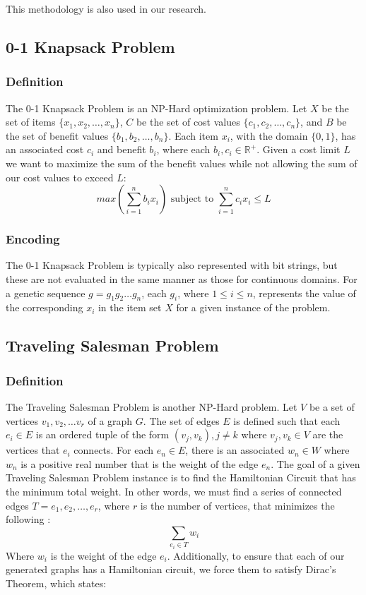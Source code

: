 \noindent This methodology is also used in our research.

%
%
\subsection*{0-1 Knapsack Problem}
\subsubsection*{Definition}

The 0-1 Knapsack Problem is an NP-Hard optimization problem. Let $X$ be the set of items $\{x_1, x_2, \ldots, x_n\}$, $C$ be the set of cost values $\{c_1, c_2, \ldots, c_n\}$, and $B$ be the set of benefit values $\{b_1, b_2, \ldots, b_n\}$. Each item $x_i$, with the domain $\{0,1\}$, has an associated cost $c_i$ and benefit $b_i$, where each $b_i,c_i \in \mathbb{R}^{+}$. Given a cost limit $L$ we want to maximize the sum of the benefit values while not allowing the sum of our cost values to exceed $L$:
\[ max\left( \sum\limits_{i = 1}^{n} b_ix_i \right) \text{ subject to } \sum\limits_{i = 1}^{n} c_ix_i \leq L \]

\subsubsection*{Encoding}
The  0-1 Knapsack Problem is typically also represented with bit strings, but these are not evaluated in the same manner as those for continuous domains. For a genetic sequence $g = g_1 g_2 \ldots g_n$, each $g_i$, where $1 \leq i \leq n$, represents the value of the corresponding $x_i$ in the item set $X$ for a given instance of the problem. 

%
%
\subsection*{Traveling Salesman Problem}
\subsubsection*{Definition}
The Traveling Salesman Problem is another NP-Hard problem. Let $V$ be a set of vertices $v_1, v_2, \ldots v_r$ of a graph $G$. The set of edges $E$ is defined such that each $e_i \in E$ is an ordered tuple of the form $(v_j,v_k), j \not = k$ where $v_j,v_k \in V$ are the vertices that $e_i$ connects. For each $e_n \in E$, there is an associated $w_n \in W$ where $w_n$ is a positive real number that is the weight of the edge $e_n$. The goal of a given Traveling Salesman Problem instance is to find the Hamiltonian Circuit that has the minimum total weight. In other words, we must find a series of connected edges $T = e_{1},e_{2},\ldots,e_{r}$, where $r$ is the number of vertices, that minimizes the following \cite{Haxhimusa11}:
\[\sum\limits_{e_{i} \in T} w_{i}\]
Where $w_{i}$ is the weight of the edge $e_{i}$. Additionally, to ensure that each of our generated graphs has a Hamiltonian circuit, we force them to satisfy Dirac's Theorem, which states:

